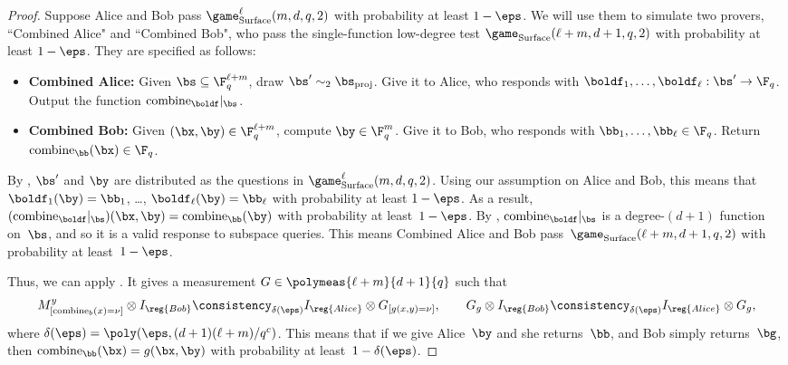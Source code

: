 \begin{proof}
Suppose Alice and Bob pass $\game_{\mathrm{Surface}}^\ell(m, d, q,2)$ with probability at least $1-\eps$.
We will use them to simulate two provers, ``Combined Alice" and ``Combined Bob", who pass
the single-function low-degree test $\game_{\mathrm{Surface}}(\ell + m, d+1, q,2)$ with probability at least $1-\eps$.
They are specified as follows:
\begin{itemize}
\item[$\circ$] \textbf{Combined Alice:} Given $\bs \subseteq \F_q^{\ell + m}$, draw $\bs' \sim_2 \bs_{\mathrm{proj}}$.  Give it to Alice, who responds with $\boldf_1, \ldots, \boldf_{\ell}: \bs' \rightarrow \F_q$.  Output the function $\mathrm{combine}_{\boldf}|_{\bs}$.
\item[$\circ$] \textbf{Combined Bob:} Given $(\bx, \by) \in \F_q^{\ell + m}$, compute $\by \in \F_q^m$. Give it to Bob, who responds with $\bb_1, \ldots, \bb_\ell \in \F_q$.
			Return $\mathrm{combine}_{\bb}(\bx) \in \F_q$.
\end{itemize}
By , $\bs'$ and $\by$ are distributed as the questions in $\game_{\mathrm{Surface}}^\ell(m, d, q,2)$.
Using our assumption on Alice and Bob, this means that $\boldf_1(\by) = \bb_1$, \ldots, $\boldf_\ell(\by) = \bb_\ell$ with probability at least $1-\eps$.
As a result, $(\mathrm{combine}_{\boldf}|_{\bs})(\bx, \by) = \mathrm{combine}_{\bb}(\by)$ with probability at least~$1-\eps$.
By , $\mathrm{combine}_{\boldf}|_{\bs}$ is a degree-$(d+1)$ function on~$\bs$,
and so it is a valid response to subspace queries.
This means Combined Alice and Bob pass~$\game_{\mathrm{Surface}}(\ell + m, d+1, q, 2)$ with probability at least~$1-\eps$.

Thus, we can apply .
It gives a measurement $G \in \polymeas{\ell+m}{d+1}{q}$ such that
\begin{equation}\label{eq:g-meas-equals-combine-meas}
M^y_{[\mathrm{combine}_b(x)=\nu]} \otimes I_{\reg{Bob}}
\consistency_{\delta(\eps)} I_{\reg{Alice}} \otimes G_{[g(x, y) = \nu]},
\qquad
G_g \otimes I_{\reg{Bob}} \consistency_{\delta(\eps)} I_{\reg{Alice}} \otimes G_g,
\end{equation}
where $\delta(\eps) = \poly(\eps, (d+1)(\ell+m)/q^c)$.
This means that if we give Alice~$\by$ and she returns~$\bb$, and Bob simply returns~$\bg$,
then $\mathrm{combine}_{\bb}(\bx) = g(\bx, \by)$ with probability at least~$1-\delta(\eps)$.


\end{proof}
